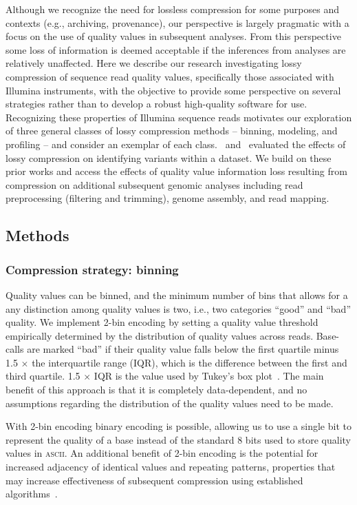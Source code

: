 \documentclass[12pt,\mydriver]{thesis}
\begin{document}
Although we recognize the need for lossless compression for some
purposes and contexts (e.g., archiving, provenance), our perspective
is largely pragmatic with a focus on the use of quality values in
subsequent analyses. From this perspective some loss of information is
deemed acceptable if the inferences from analyses are relatively
unaffected. Here we describe our research investigating lossy
compression of sequence read quality values, specifically those
associated with Illumina instruments, with the objective to provide
some perspective on several strategies rather than to develop a robust
high-quality software for use. Recognizing these properties of
Illumina sequence reads motivates our exploration of three general
classes of lossy compression methods -- binning, modeling, and
profiling -- and consider an exemplar of each class.~\cite{Canovas:2014fr} and~\cite{janin2013adaptive} evaluated the effects of lossy compression on identifying variants within a dataset. We build on these prior works and access the effects of
quality value information loss resulting from compression on additional
subsequent genomic analyses including read preprocessing (filtering
and trimming), genome assembly, and read mapping.

\subsection{Methods}

\subsubsection{Compression strategy: binning}

Quality values can be binned, and the minimum number of bins that
allows for a any distinction among quality values is two, i.e., two
categories ``good'' and ``bad'' quality. We implement 2-bin encoding
by setting a quality value threshold empirically determined by the
distribution of quality values across reads. Base-calls are marked
``bad'' if their quality value falls below the first quartile minus
1.5 $\times$ the interquartile range (IQR), which is the difference
between the first and third quartile. 1.5 $\times$ IQR is the value
used by Tukey's box plot~\cite{mcgill1978variations}. The main
benefit of this approach is that it is completely data-dependent, and
no assumptions regarding the distribution of the quality values need
to be made.

With 2-bin encoding binary encoding is possible, allowing us to use a
single bit to represent the quality of a base instead of the standard
8 bits used to store quality values in \textsc{ascii}. An additional
benefit of 2-bin encoding is the potential for increased adjacency of
identical values and repeating patterns, properties that may increase
effectiveness of subsequent compression using established
algorithms~\cite{HUFFMAN:1952nr,Ziv77auniversal,
  DBLP:journals/tit/ZivL78}.
\end{document}
